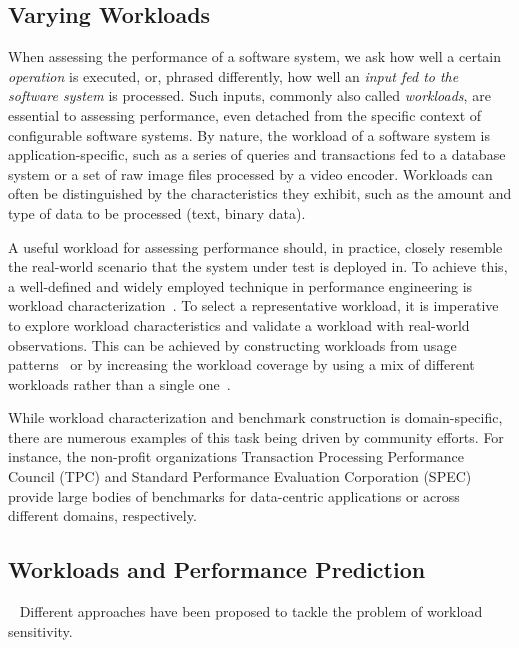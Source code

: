 {\color{black}
\subsection{Varying Workloads}\label{sec:varying_workloads}
When assessing the performance of a software system, we ask how well a certain \textit{operation} is executed, or, phrased differently, how well an \textit{input fed to the software system} is processed. Such inputs, commonly also called \textit{workloads}, are essential to assessing performance, even detached from the specific context of configurable software systems. By nature, the workload of a software system is application-specific, such as a series of queries and transactions fed to a database system or a set of raw image files processed by a video encoder. Workloads can often be distinguished by the characteristics they exhibit, such as the amount and type of data to be processed (text, binary data).

A useful workload for assessing performance should, in practice, closely resemble the real-world scenario that the system under test is deployed in. To achieve this, a well-defined and widely employed technique in performance engineering is workload characterization~\cite{ceesay2020,papadopoulos2021}. To select a representative workload, it is imperative to explore workload characteristics and validate a workload with real-world observations. This can be achieved by constructing workloads from usage patterns~\cite{calzarossa2016} or by increasing the workload coverage by using a mix of different workloads rather than a single one~\cite{jiang2015survey}.

While workload characterization and benchmark construction is domain-specific, there are numerous examples of this task being driven by community efforts. For instance, the non-profit organizations Transaction Processing Performance Council (TPC) and Standard Performance Evaluation Corporation (SPEC) provide large bodies of benchmarks for data-centric applications or across different domains, respectively.
	
\subsection{Workloads and Performance Prediction} ~\label{sec:strategies}
Different approaches have been proposed to tackle the problem of workload sensitivity.

}
